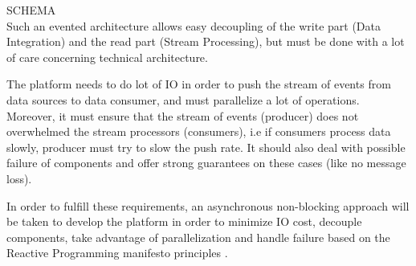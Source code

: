 SCHEMA
\\

Such an evented architecture allows easy decoupling of the write part (Data Integration) and the read part (Stream Processing),
but must be done with a lot of care concerning technical architecture.

The platform needs to do lot of IO in order to push the stream of events from data sources to data consumer, and must
parallelize a lot of operations. Moreover, it must ensure that the stream of events (producer) does not overwhelmed the stream
processors (consumers), i.e if consumers process data slowly, producer must try to slow the push rate. It should also deal with possible
failure of components and offer strong guarantees on these cases (like no message loss).

In order to fulfill these requirements, an asynchronous non-blocking approach will be taken to develop the platform in order to
minimize IO cost, decouple components, take advantage of parallelization and handle failure based on the 
Reactive Programming manifesto principles \cite{bib:reactiveManifesto}.










